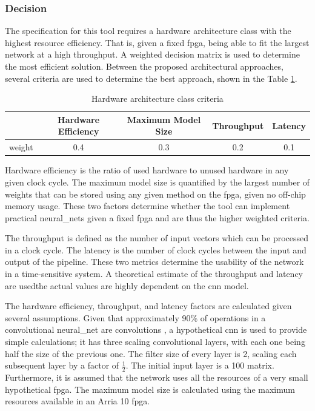\documentclass{uw-ece-wkrpt}
\begin{document}
\subsubsection{Decision}\label{sec:decision}

The specification for this tool requires a hardware architecture class with the highest resource efficiency. That is, given a fixed \gls{fpga}, being able to fit the largest network at a high throughput. A weighted decision matrix is used to determine the most efficient solution. Between the proposed architectural approaches, several criteria are used to determine the best approach, shown in the Table \ref{tab:hw_arch_criteria}.

\begin{table}[hbp]
\centering
\caption{Hardware architecture class criteria}\label{tab:hw_arch_criteria}
\begin{tabular}{lcccc}
\toprule
       & Hardware Efficiency & Maximum Model Size & Throughput & Latency \\
\midrule
\Gls{weight} & 0.4 & 0.3 & 0.2 & 0.1 \\
\bottomrule
\end{tabular}
\end{table}

 Hardware efficiency is the ratio of used hardware to unused hardware in any given clock cycle. The maximum model size is quantified by the largest number of weights that can be stored using any given method on the \gls{fpga}, given no off-chip memory usage. These two factors determine whether the tool can implement practical \glspl{neural_net} given a fixed \gls{fpga} and are thus the higher weighted criteria.

The throughput is defined as the number of input vectors which can be processed in a clock cycle. The latency is the number of clock cycles between the input and output of the pipeline. These two metrics determine the usability of the network in a time-sensitive system. A theoretical estimate of the throughput and latency are used\textemdash{}the actual values are highly dependent on the \gls{cnn} model.

The hardware efficiency, throughput, and latency factors are calculated given several assumptions. Given that approximately 90\% of operations in a convolutional \gls{neural_net} are convolutions \cite{Cong2014Minimizing-Comp}, a hypothetical \gls{cnn} is used to provide simple calculations; it has three scaling convolutional layers, with each one being half the size of the previous one. The \gls{filter} size of every layer is 2, scaling each subsequent layer by a factor of $\frac{1}{2}$. The initial input layer is a 100 matrix. Furthermore, it is assumed that the network uses all the resources of a very small hypothetical \gls{fpga}. The maximum model size is calculated using the maximum resources available in an Arria 10 \gls{fpga}.
\end{document}
